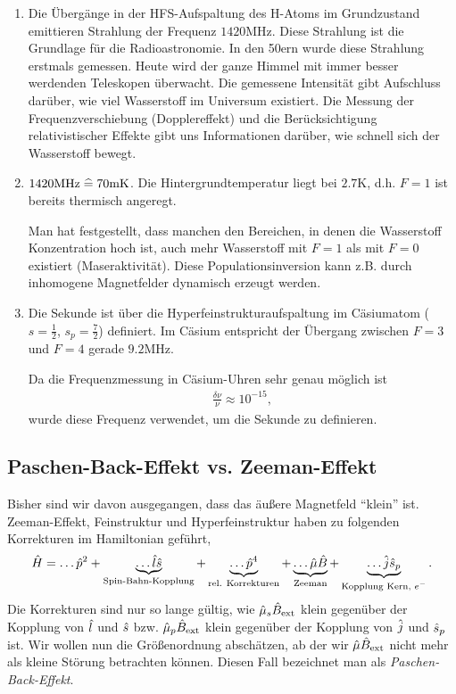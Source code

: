 \begin{bemn}[Bemerkungen.]
\begin{enumerate}[label=\arabic{*}.)]
  \item Die Übergänge in der HFS-Aufspaltung des H-Atoms im Grundzustand
  emittieren Strahlung der Frequenz $1420\mathrm{MHz}$. Diese Strahlung
   ist die Grundlage für die Radioastronomie. In den 50ern wurde diese
 Strahlung erstmals gemessen. Heute wird der ganze Himmel mit immer besser werdenden Teleskopen überwacht. Die gemessene Intensität gibt Aufschluss
darüber, wie viel Wasserstoff im Universum existiert. Die Messung der
Frequenzverschiebung (Dopplereffekt) und die Berücksichtigung relativistischer
Effekte gibt uns Informationen darüber, wie schnell sich der Wasserstoff bewegt.
\item $1420\mathrm{MHz}\mathrel{\widehat{=}} 70\mathrm{mK}$. Die Hintergrundtemperatur liegt
bei $2.7\mathrm{K}$, d.h. $F=1$ ist bereits thermisch angeregt.

Man hat festgestellt, dass manchen den Bereichen, in denen die Wasserstoff
Konzentration hoch ist, auch mehr Wasserstoff mit $F=1$ als mit $F=0$
existiert (Maseraktivität). Diese Populationsinversion kann z.B. durch
inhomogene Magnetfelder dynamisch erzeugt werden.
\item Die Sekunde ist über die Hyperfeinstrukturaufspaltung im Cäsiumatom
($s=\frac{1}{2}$, $s_p=\frac{7}{2}$) definiert. Im Cäsium entspricht der
Übergang zwischen $F=3$ und $F=4$ gerade
$9.2\mathrm{MHz}$.

Da die Frequenzmessung in Cäsium-Uhren sehr genau möglich ist
\begin{align*}
\frac{\delta\nu}{\nu} \approx 10^{-15},
\end{align*}
 wurde diese Frequenz verwendet, um die
Sekunde zu definieren.\maphere
\end{enumerate}
\end{bemn}


\subsection{Paschen-Back-Effekt vs. Zeeman-Effekt}

Bisher sind wir davon ausgegangen, dass das äußere Magnetfeld ``klein'' ist.
Zeeman-Effekt, Feinstruktur und Hyperfeinstruktur haben zu folgenden
Korrekturen im Hamiltonian geführt,
\begin{align*}
\hat{\boldmath{H}} = \ldots \hat{\boldmath{p}}^2 + \underbrace{\ldots
\hat{\boldmath{l}}\hat{\boldmath{s}}}_{\text{Spin-Bahn-Kopplung}} + \underbrace{\ldots
\hat{\boldmath{p}}^4}_{\text{rel. Korrekturen}} +
\underbrace{\ldots\hat{\boldmath{\mu}}\hat{\boldmath{B}}}_{\text{Zeeman}} + \underbrace{\ldots
\hat{\boldmath{j}}\hat{\boldmath{s}}_p}_{\text{Kopplung Kern, $e^-$}}.
\end{align*}
Die Korrekturen sind nur so lange gültig, wie $\hat{\boldmath{\mu}}_s \hat{\boldmath{B}}_\text{ext}$
klein gegenüber der Kopplung von $\hat{\boldmath{l}}$ und $\hat{\boldmath{s}}$ bzw.
$\hat{\boldmath{\mu}}_{p}\hat{\boldmath{B}}_\text{ext}$ klein gegenüber der Kopplung von $\hat{\boldmath{j}}$ und
$\hat{\boldmath{s}}_p$ ist. Wir wollen nun die Größenordnung abschätzen, ab der wir
$\hat{\boldmath{\mu}}\hat{\boldmath{B}}_\text{ext}$ nicht mehr als kleine Störung betrachten können.
Diesen Fall bezeichnet man als \emph{Paschen-Back-Effekt}.

